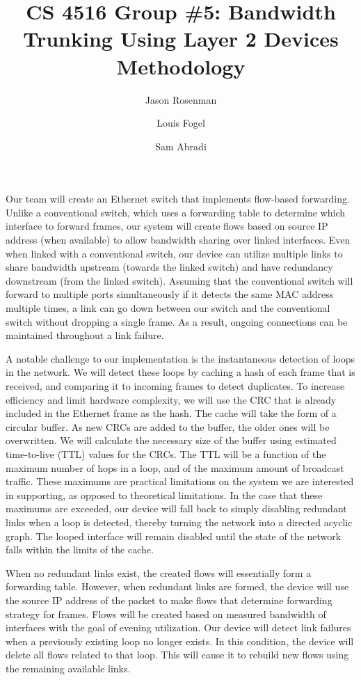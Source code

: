 \documentclass{article}
\title{CS 4516 Group \#5: Bandwidth Trunking Using Layer 2 Devices\\Methodology}
\author{Jason Rosenman \and Louis Fogel \and Sam Abradi}
\date{}
\begin{document}
\maketitle
	Our team will create an Ethernet switch that implements flow-based forwarding.
	Unlike a conventional switch, which uses a forwarding table to determine which interface to forward frames, our system will create flows based on source IP address (when available) to allow bandwidth sharing over linked interfaces.
	Even when linked with a conventional switch, our device can utilize multiple links to share bandwidth upstream (towards the linked switch) and have redundancy downstream (from the linked switch).
	Assuming that the conventional switch will forward to multiple ports simultaneously if it detects the same MAC address multiple times, a link can go down between our switch and the conventional switch without dropping a single frame.
	As a result, ongoing connections can be maintained throughout a link failure.

	A notable challenge to our implementation is the instantaneous detection of loops in the network.
	We will detect these loops by caching a hash of each frame that is received, and comparing it to incoming frames to detect duplicates.
	To increase efficiency and limit hardware complexity, we will use the CRC that is already included in the Ethernet frame as the hash.
	The cache will take the form of a circular buffer.
	As new CRCs are added to the buffer, the older ones will be overwritten.
	We will calculate the necessary size of the buffer using estimated time-to-live (TTL) values for the CRCs.
	The TTL will be a function of the maximum number of hops in a loop, and of the maximum amount of broadcast traffic.
	These maximums are practical limitations on the system we are interested in supporting, as opposed to theoretical limitations.
	In the case that these maximums are exceeded, our device will fall back to simply disabling redundant links when a loop is detected, thereby turning the network into a directed acyclic graph.
	The looped interface will remain disabled until the state of the network falls within the limits of the cache.
	
	When no redundant links exist, the created flows will essentially form a forwarding table.
	However, when redundant links are formed, the device will use the source IP address of the packet to make flows that determine forwarding strategy for frames.
	Flows will be created based on measured bandwidth of interfaces with the goal of evening utilization.
	Our device will detect link failures when a previously existing loop no longer exists.
	In this condition, the device will delete all flows related to that loop.
	This will cause it to rebuild new flows using the remaining available links.
\end{document}
